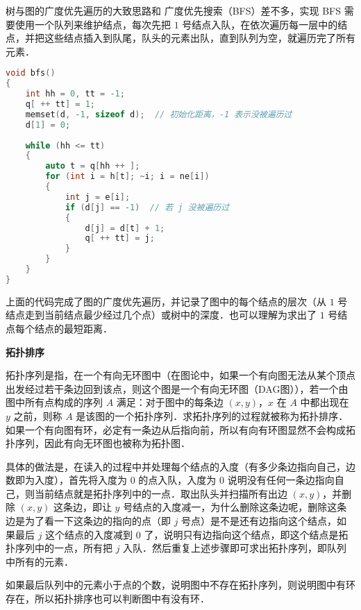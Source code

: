 
树与图的广度优先遍历的大致思路和 广度优先搜索（BFS）差不多，实现 BFS 需要使用一个队列来维护结点，每次先把 $1$ 号结点入队，在依次遍历每一层中的结点，并把这些结点插入到队尾，队头的元素出队，直到队列为空，就遍历完了所有元素．

\begin{lstlisting}[language=cpp]
void bfs()
{
    int hh = 0, tt = -1;
    q[ ++ tt] = 1;
    memset(d, -1, sizeof d);  // 初始化距离，-1 表示没被遍历过
    d[1] = 0;
    
    while (hh <= tt)
    {
        auto t = q[hh ++ ];
        for (int i = h[t]; ~i; i = ne[i])
        {
            int j = e[i];
            if (d[j] == -1)  // 若 j 没被遍历过
            {
                d[j] = d[t] + 1;
                q[ ++ tt] = j;
            }
        }
    }
}
\end{lstlisting}

上面的代码完成了图的广度优先遍历，并记录了图中的每个结点的层次（从 $1$ 号结点走到当前结点最少经过几个点）或树中的深度．也可以理解为求出了 $1$ 号结点每个结点的最短距离．

\textbf{拓扑排序}

拓扑序列是指，在一个有向无环图中（在图论中，如果一个有向图无法从某个顶点出发经过若干条边回到该点，则这个图是一个有向无环图（DAG图）），若一个由图中所有点构成的序列 $A$ 满足：对于图中的每条边 $(x, y)$，$x$ 在 $A$ 中都出现在 $y$ 之前，则称 $A$ 是该图的一个拓扑序列．求拓扑序列的过程就被称为拓扑排序．如果一个有向图有环，必定有一条边从后指向前，所以有向有环图显然不会构成拓扑序列，因此有向无环图也被称为拓扑图．

具体的做法是，在读入的过程中并处理每个结点的入度（有多少条边指向自己，边数即为入度），首先将入度为 $0$ 的点入队，入度为 $0$ 说明没有任何一条边指向自己，则当前结点就是拓扑序列中的一点．取出队头并扫描所有出边 $(x, y)$，并删除 $(x, y)$ 这条边，即让 $y$ 号结点的入度减一，为什么删除这条边呢，删除这条边是为了看一下这条边的指向的点（即 $j$ 号点）是不是还有边指向这个结点，如果最后 $j$ 这个结点的入度减到 $0$ 了，说明只有边指向这个结点，即这个结点是拓扑序列中的一点，所有把 $j$ 入队．然后重复上述步骤即可求出拓扑序列，即队列中所有的元素．

如果最后队列中的元素小于点的个数，说明图中不存在拓扑序列，则说明图中有环存在，所以拓扑排序也可以判断图中有没有环．

